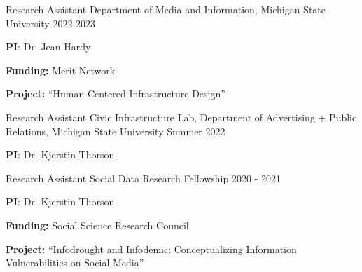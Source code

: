 \newpage
{}

\begin{cventries}
    \cventry
    {Research Assistant} %
    {Department of Media and Information,  Michigan State University } %
    {} %
    {2022-2023} %
    {
      \begin{cvitems} %
              \item[] {\textbf{PI}: Dr. Jean Hardy}
              \item[] {\textbf{Funding: }Merit Network}
              \item[] {\textbf{Project: }“Human-Centered Infrastructure Design”}
      \end{cvitems}
    }
    
    \cventry
    {Research Assistant} %
    {Civic Infrastructure Lab, Department of Advertising + Public Relations, Michigan State University } %
    {} %
    {Summer 2022} %
    {
      \begin{cvitems} %
              \item[] {\textbf{PI}: Dr. Kjerstin Thorson}
      \end{cvitems}
    }
    
  \cventry
    {Research Assistant} %
    {Social Data Research Fellowship} %
    {} %
    {2020 - 2021} %
    {
      \begin{cvitems} %
            \item[] {\textbf{PI}: Dr. Kjerstin Thorson}
            \item[] {\textbf{Funding: }Social Science Research Council}
            \item[] {\textbf{Project: }“Infodrought and Infodemic: Conceptualizing Information Vulnerabilities on Social Media”}
      \end{cvitems}
    }
    

\end{cventries}
